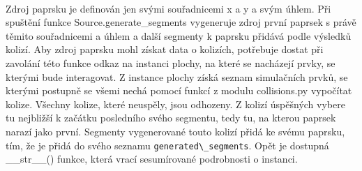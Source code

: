 \documentclass[12pt,a4paper]{report}
\begin{document}
\paragraph{} Zdroj paprsku je definován jen svými souřadnicemi x a y a svým úhlem. Při spuštění funkce Source.generate\_segments vygeneruje zdroj první paprsek s právě těmito souřadnicemi a úhlem a další segmenty k paprsku přidává podle výsledků kolizí. Aby zdroj paprsku mohl získat data o kolizích, potřebuje dostat při zavolání této funkce odkaz na instanci plochy, na které se nacházejí prvky, se kterými bude interagovat. Z instance plochy získá seznam simulačních prvků, se kterými postupně se všemi nechá pomocí funkcí z modulu collisions.py vypočítat kolize. Všechny kolize, které neuspěly, jsou odhozeny. Z kolizí úspěšných vybere tu nejbližší k začátku posledního svého segmentu, tedy tu, na kterou paprsek narazí jako první. Segmenty vygenerované touto kolizí přidá ke svému paprsku, tím, že je přidá do svého seznamu \lstinline{generated\_segments}. Opět je dostupná \_\_str\_\_() funkce, která vrací sesumírované podrobnosti o instanci.
\end{document}
